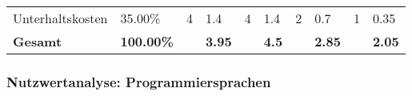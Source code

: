 \begin{sidewaystable}
\begin{tabular}{llllllllll}
		\rowcolor[HTML]{BBDAFF}
		Unterhaltskosten                          & 35.00\%                                 & 4                                                   & 1.4                                    & 4                                                   & 1.4                                    & 2                                                     & 0.7                                    & 1                                         & 0.35                                   \\
		\textbf{Gesamt}                           & \textbf{100.00\%}                       & \textbf{}                                           & \textbf{3.95}                          & \textbf{}                                           & \textbf{4.5}                           & \textbf{}                                             & \textbf{2.85}                          & \textbf{}                                 & \textbf{2.05}
	\end{tabular}
\end{sidewaystable}

\subsubsection{Nutzwertanalyse: Programmiersprachen}

